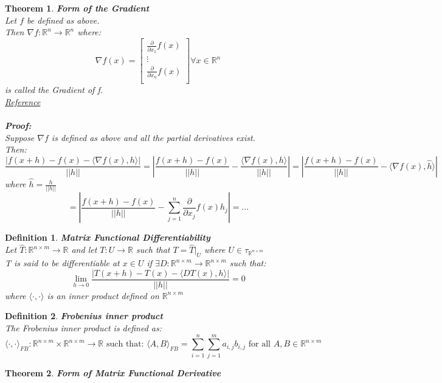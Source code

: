 \documentclass[12pt]{extarticle}
\theoremstyle{plain}
\newtheorem{thm}{Theorem}[section]
\theoremstyle{Definition}
\newtheorem{def.}{Definition}[section]
\theoremstyle{Definition}
\theoremstyle{plain}
\begin{document}
\begin{thm} \textbf{Form of the Gradient} \\ 
	Let $f$ be defined as above. \\ 
	Then $\nabla f: \mathbb{R}^n \to \mathbb{R}^n$ where: \\ 
	\[
	\nabla f(x) = 
	\begin{bmatrix}
	\frac{\partial }{\partial x_1}f(x) \\ 
	\vdots \\
	\frac{\partial }{\partial x_n}f(x) \\ 				
	\end{bmatrix}
	\forall x \in \mathbb{R}^n
	\]
	is called the Gradient of f. \\
	\href{https://en.wikipedia.org/wiki/Gradient}{Reference} \\ \\
	\textbf{Proof:} \\ 
	Suppose $\nabla f$ is defined as above and all the partial derivatives exist. \\ 
	Then: 
	$$\frac{|f(x + h) - f(x) - \langle \nabla f(x),h \rangle|}{||h||} = \left|\frac{f(x + h) - f(x)}{||h||} - \frac{\langle \nabla f(x),h \rangle}{||h||} \right| = \left| \frac{f(x + h) - f(x)}{||h||} - \langle \nabla f(x), \hat{h} \rangle \right|$$
	where $\hat{h} = \frac{h}{||h||}$
	$$ = \left| \frac{f(x + h) - f(x)}{||h||} - \sum_{j=1}^n \frac{\partial}{\partial x_j} f(x)  \hat{h}_j \right| = ...$$
\end{thm}
\newpage
\begin{def.} \textbf{Matrix Functional Differentiability} \\ 
	Let $\hat{T} : \mathbb{R}^{n \times m} \to \mathbb{R}$ and let $T : U \to \mathbb{R}$ such that $T = \hat{T}|_U$ where $U \in \tau_{\mathbb{R}^{n \times m}}$ \\ 
	T is said to be differentiable at $x \in U$ if $\exists D : \mathbb{R}^{n \times m} \to \mathbb{R}^{n \times m}$ such that: \\  
	$$\lim_{h \to 0}\frac{|T(x + h) - T(x) - \langle D T(x),h \rangle|}{||h||} = 0$$
	where $\langle \cdot, \cdot \rangle$ is an inner product defined on $\mathbb{R}^{n \times m}$
\end{def.}
\begin{def.} \textbf{Frobenius inner product} \\
	The Frobenius inner product is defined as: \\ 
	$$\langle \cdot , \cdot \rangle_{FB} : \mathbb{R}^{n \times m} \times \mathbb{R}^{n \times m} \to \mathbb{R} \text{ such that: } \langle A,B \rangle_{FB} = \sum_{i=1}^n \sum_{j=1}^m a_{i,j}b_{i,j} \text{ for all } A,B \in \mathbb{R}^{n \times m}$$
\end{def.}
\begin{thm} \textbf{Form of Matrix Functional Derivative} \\
	

\end{thm}
\end{document}
